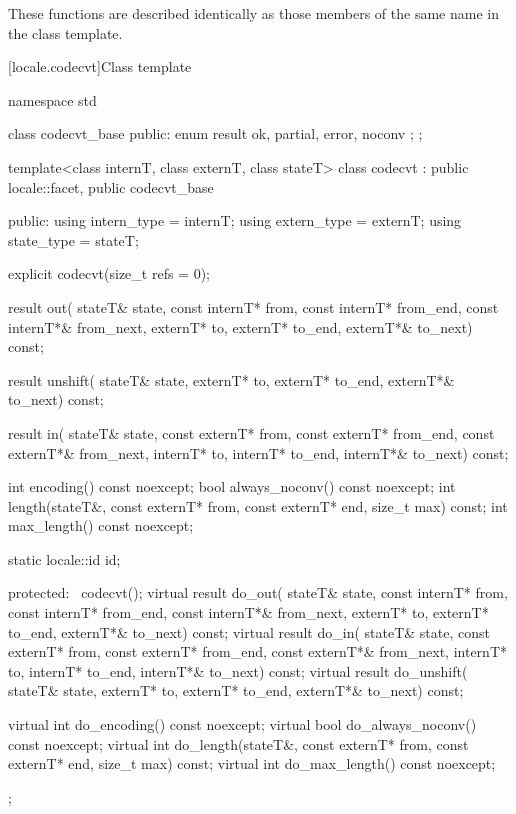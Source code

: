 \pnum
These functions are described identically as those members of the
same name in the
class template.

[locale.codecvt]{Class template }

%
\begin{codeblock}
namespace std {
  class codecvt_base {
  public:
    enum result { ok, partial, error, noconv };
  };

  template<class internT, class externT, class stateT>
    class codecvt : public locale::facet, public codecvt_base {
    public:
      using intern_type = internT;
      using extern_type = externT;
      using state_type  = stateT;

      explicit codecvt(size_t refs = 0);

      result out(
          stateT& state,
          const internT* from, const internT* from_end, const internT*& from_next,
                externT*   to,       externT*   to_end,       externT*&   to_next) const;

      result unshift(
          stateT& state,
                externT*    to,      externT*   to_end,       externT*&   to_next) const;

      result in(
          stateT& state,
          const externT* from, const externT* from_end, const externT*& from_next,
                internT*   to,       internT*   to_end,       internT*&   to_next) const;

      int encoding() const noexcept;
      bool always_noconv() const noexcept;
      int length(stateT&, const externT* from, const externT* end, size_t max) const;
      int max_length() const noexcept;

      static locale::id id;

    protected:
      ~codecvt();
      virtual result do_out(
          stateT& state,
          const internT* from, const internT* from_end, const internT*& from_next,
                externT* to,         externT*   to_end,       externT*&   to_next) const;
      virtual result do_in(
          stateT& state,
          const externT* from, const externT* from_end, const externT*& from_next,
                internT* to,         internT*   to_end,       internT*&   to_next) const;
      virtual result do_unshift(
          stateT& state,
                externT* to,         externT*   to_end,       externT*&   to_next) const;

      virtual int do_encoding() const noexcept;
      virtual bool do_always_noconv() const noexcept;
      virtual int do_length(stateT&, const externT* from, const externT* end, size_t max) const;
      virtual int do_max_length() const noexcept;
    };
}
\end{codeblock}


